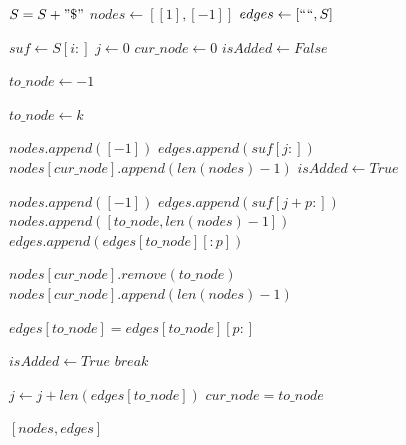 \documentclass[letterpaper, 11pt]{article}
\begin{document}
\clearpage
\begin{algorithmic}[1]
\State $S = S + " \$ "$
\State $nodes \gets [[1], [-1]]$
\State $edges \gets [`` ``, S]$

\item[]
\State $suf \gets S[i:]$
\State $j \gets 0$
\State $cur\_node \gets 0$
\State $isAdded \gets False$

\item[]
\State $to\_node \gets -1$

\State $to\_node \gets k$
\EndIf
\EndFor

\item[]

\State $nodes.append([-1])$ 
\State $edges.append(suf[j:])$  
\State $nodes[cur\_node].append(len(nodes) - 1)$ 
\State $isAdded \gets True$
\Else
{}

\State $nodes.append([-1])$ 
\State $edges.append(suf[j + p:])$ 
\State $nodes.append([to\_node, len(nodes) - 1])$ 
\State $edges.append(edges[to\_node][:p])$ 

\item[]
\item[] 
\State $nodes[cur\_node].remove(to\_node)$
\State $nodes[cur\_node].append(len(nodes) - 1)$ 

\State $edges[to\_node] = edges[to\_node][p:]$ 


\State $isAdded \gets True$
\State $break$
\EndIf

\EndFor

\State $j \gets j + len(edges[to\_node])$
\State $cur\_node = to\_node$

\EndIf

\EndWhile

\EndFor
\item[]
\State \Return $[nodes, edges]$
\EndProcedure
\end{algorithmic}


\clearpage
\end{document}
